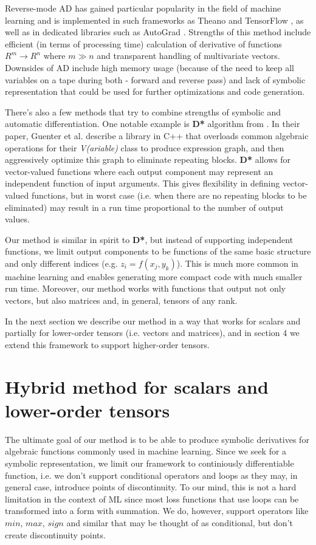 \documentclass[conference]{IEEEtran}
\begin{document}
Reverse-mode AD has gained particular popularity in the field of machine learning and is implemented in such frameworks as Theano \cite{Theano} and TensorFlow \cite{TensorFlow}, as well as in dedicated libraries such as AutoGrad \cite{AutoGrad}. Strengths of this method include efficient (in terms of processing time) calculation of derivative of functions $R^m \to R^n$ where $m \gg n$ and transparent handling of multivariate vectors. Downsides of AD include high memory usage (because of the need to keep all variables on a tape during both - forward and reverse pass) and lack of symbolic representation that could be used for further optimizations and code generation. 

There's also a few methods that try to combine strengths of symbolic and automatic differentiation. One notable example is \textbf{D*} algorithm from \cite{guenter2007}. In their paper, Guenter et al. describe a library in C++ that overloads common algebraic operations for their \textit{V(ariable)} class to produce expression graph, and then aggressively optimize this graph to eliminate repeating blocks. \textbf{D*} allows for vector-valued functions where each output component may represent an independent function of input arguments. This gives flexibility in defining vector-valued functions, but in worst case (i.e. when there are no repeating blocks to be eliminated) may result in a run time proportional to the number of output values. 

Our method is similar in spirit to \textbf{D*}, but instead of supporting independent functions, we limit output components to be functions of the same basic structure and only different indices (e.g. $z_i = f(x_j, y_k)$). This is much more common in machine learning and enables generating more compact code with much smaller run time. Moreover, our method works with functions that output not only vectors, but also matrices and, in general, tensors of any rank. 

In the next section we describe our method in a way that works for scalars and partially for lower-order tensors (i.e. vectors and matrices), and in section 4 we extend this framework to support higher-order tensors.

\section{Hybrid method for scalars and lower-order tensors}

The ultimate goal of our method is to be able to produce symbolic derivatives for algebraic functions commonly used in machine learning. Since we seek for a symbolic representation, we limit our framework to continiously differentiable function, i.e. we don't support conditional operators and loops as they may, in general case, introduce points of discontinuity. To our mind, this is not a hard limitation in the context of ML since most loss functions that use loops can be transformed into a form with summation. We do, however, support operators like $min$, $max$, $sign$ and similar that may be thought of as conditional, but don't create discontinuity points.
\end{document}
